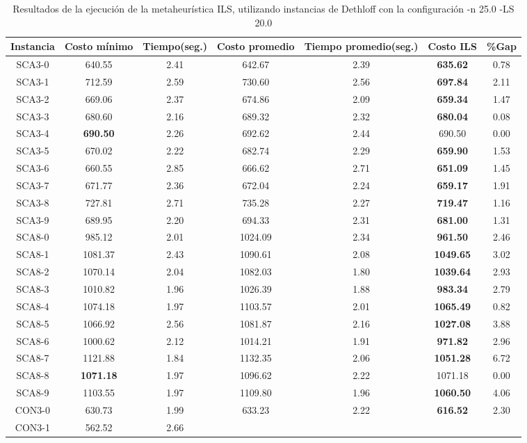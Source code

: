 \begin{table}[ht]
\caption{Resultados de la ejecución de la metaheurística ILS, utilizando instancias de Dethloff con la configuración -n 25.0 -LS 20.0}
\centering
\small
\begin{tabular}{c c c c c c c}
\hline\hline
Instancia & Costo mínimo & Tiempo(seg.) & Costo promedio & Tiempo promedio(seg.) & Costo ILS & \%Gap \\ [0.5ex]
\hline
SCA3-0 & 640.55 & 2.41 & 
642.67 & 2.39 & \bf{635.62} & 
0.78\\SCA3-1 & 712.59 & 2.59 & 
730.60 & 2.56 & \bf{697.84} & 
2.11\\SCA3-2 & 669.06 & 2.37 & 
674.86 & 2.09 & \bf{659.34} & 
1.47\\SCA3-3 & 680.60 & 2.16 & 
689.32 & 2.32 & \bf{680.04} & 
0.08\\SCA3-4 & \bf{690.50} & 2.26 & 
692.62 & 2.44 & 690.50 & 0.00\\
SCA3-5 & 670.02 & 2.22 & 
682.74 & 2.29 & \bf{659.90} & 
1.53\\SCA3-6 & 660.55 & 2.85 & 
666.62 & 2.71 & \bf{651.09} & 
1.45\\SCA3-7 & 671.77 & 2.36 & 
672.04 & 2.24 & \bf{659.17} & 
1.91\\SCA3-8 & 727.81 & 2.71 & 
735.28 & 2.27 & \bf{719.47} & 
1.16\\SCA3-9 & 689.95 & 2.20 & 
694.33 & 2.31 & \bf{681.00} & 
1.31\\SCA8-0 & 985.12 & 2.01 & 
1024.09 & 2.34 & \bf{961.50} & 
2.46\\SCA8-1 & 1081.37 & 2.43 & 
1090.61 & 2.08 & \bf{1049.65} & 
3.02\\SCA8-2 & 1070.14 & 2.04 & 
1082.03 & 1.80 & \bf{1039.64} & 
2.93\\SCA8-3 & 1010.82 & 1.96 & 
1026.39 & 1.88 & \bf{983.34} & 
2.79\\SCA8-4 & 1074.18 & 1.97 & 
1103.57 & 2.01 & \bf{1065.49} & 
0.82\\SCA8-5 & 1066.92 & 2.56 & 
1081.87 & 2.16 & \bf{1027.08} & 
3.88\\SCA8-6 & 1000.62 & 2.12 & 
1014.21 & 1.91 & \bf{971.82} & 
2.96\\SCA8-7 & 1121.88 & 1.84 & 
1132.35 & 2.06 & \bf{1051.28} & 
6.72\\SCA8-8 & \bf{1071.18} & 1.97 & 
1096.62 & 2.22 & 1071.18 & 0.00\\
SCA8-9 & 1103.55 & 1.97 & 
1109.80 & 1.96 & \bf{1060.50} & 
4.06\\CON3-0 & 630.73 & 1.99 & 
633.23 & 2.22 & \bf{616.52} & 
2.30\\CON3-1 & 562.52 & 2.66 & 

\end{tabular}
\end{table}
